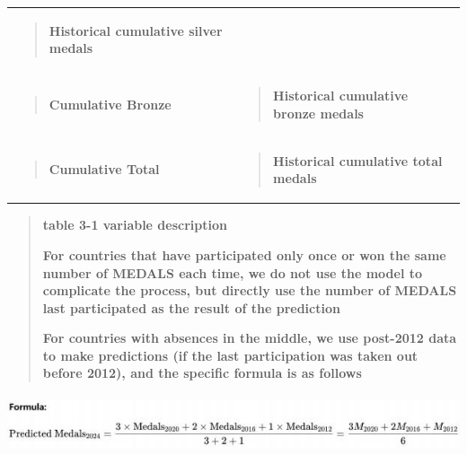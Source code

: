 \documentclass[12pt,a4paper]{article}
\renewenvironment{quote}{\begin{quotation}}{\end{quotation}}  %
\begin{document}
\begin{longtable}[]{@{}
      >{\raggedright\arraybackslash}p{}
      >{\raggedright\arraybackslash}p{}@{}}
\begin{minipage}[t]{\linewidth}
\begin{quote}
    \textbf{Historical cumulative silver medals}
    \end{quote}
    \end{minipage} \\
    \begin{minipage}[t]{\linewidth}\raggedright
    \begin{quote}
    \textbf{Cumulative Bronze}
    \end{quote}
    \end{minipage} & \begin{minipage}[t]{\linewidth}\raggedright
    \begin{quote}
    \textbf{Historical cumulative bronze medals}
    \end{quote}
    \end{minipage} \\
    \begin{minipage}[t]{\linewidth}\raggedright
    \begin{quote}
    \textbf{Cumulative Total}
    \end{quote}
    \end{minipage} & \begin{minipage}[t]{\linewidth}\raggedright
    \begin{quote}
    \textbf{Historical cumulative total medals}
    \end{quote}
    \end{minipage} \\
    \end{longtable}
    
    \begin{quote}
    \textbf{table 3-1 variable description}
    
    \textbf{For countries that have participated only once or won the same
    number of MEDALS each time, we do not use the model to complicate the
    process, but directly use the number of MEDALS last participated as the
    result of the prediction}
    
    \textbf{For countries with absences in the middle, we use post-2012 data
    to make predictions (if the last participation was taken out before
    2012), and the specific formula is as follows}
    \end{quote}
    
    \includegraphics[width=6.29833in,height=0.67in]{./media/media/image7.jpeg}
    
\end{document}
